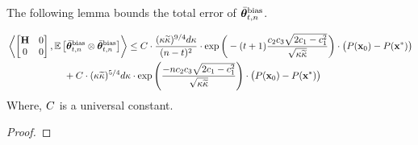 The following lemma bounds the total error of ${\bar{\boldsymbol{\theta}}}_{t,n}^{\textrm{bias}}$.
\begin{lemma}\label{lem:bound-bias}
\iffalse
	\begin{align*}
	&\iprod{\begin{bmatrix}
			\Cov & \zero \\ \zero & \zero
		\end{bmatrix}}{\E{\thetavb^{\textrm{bias}} \otimes \thetavb^{\text{bias}}}} \\ &\leq \frac{1792}{(n-t)^2(\cone\cfour)^{5/4}}\cdot\frac{(\cnH\cnS)^{9/4}d}{\delta\cfour}\cdot\exp\bigg(-(t+1)\frac{\ctwo\cthree\sqrt{2\cone-\cone^2}}{\sqrt{\cnH\cnS}}\bigg)\norm{\thetat[0]}^2 +\\&\qquad\qquad \frac{5376}{(\cone\cfour)^{1/4}}\frac{(\cnH\cnS)^{5/4}d}{\delta\cfour}\exp\left(\frac{-n \ctwo \cthree \sqrt{2\cone-\cone^2} }{\sqrt{\cnH\cnS}}\right) \cdot \norm{\thetat[0]}^2.
	\end{align*}
	\fi
	\iffalse
	\begin{align*}
		&\iprod{\begin{bmatrix}
			\Cov & \zero \\ \zero & \zero
			\end{bmatrix} }{\E{\thetavb^{\textrm{bias}} \otimes \thetavb^{\text{bias}}}} \leq			\UC\cdot\frac{(\cnH\cnS)^{9/4}d}{\delta}\cdot\exp\bigg(-(t+1)\frac{\ctwo\cthree\sqrt{2\cone-\cone^2}}{\sqrt{\cnH\cnS}}\bigg)\norm{\thetat[0]}^2 \nonumber\\&\qquad\qquad\qquad+  \UC\cdot\frac{(\cnH\cnS)^{5/4}d}{\delta}(n-t)\exp\left(\frac{-n \ctwo \cthree \sqrt{2\cone-\cone^2} }{\sqrt{\cnH\cnS}}\right) \cdot \norm{\thetat[0]}^2
			\end{align*}	
			\fi
	\begin{align*}
		&\left\langle \begin{bmatrix}
			\mathbf{H} & 0 \\ 0 & 0
			\end{bmatrix} , \mathbb{E}\left[{\bar{\boldsymbol{\theta}}}_{t,n}^{\textrm{bias}} \otimes {\bar{\boldsymbol{\theta}}}_{t,n}^{\text{bias}}\right] \right\rangle \leq		C\cdot\frac{({\kappa}\widetilde{\kappa})^{9/4}d{\kappa}}{(n-t)^2}\cdot\exp\bigg(-(t+1)\frac{c_2c_3\sqrt{2c_1-c_1^2}}{\sqrt{{\kappa}\widetilde{\kappa}}}\bigg)\cdot \big(P(\mathbf{x}_0)-P(\mathbf{x}^*)\big) \nonumber\\&\qquad\qquad\qquad+  C\cdot({\kappa}\widetilde{\kappa})^{5/4}d{\kappa}\cdot\exp\left(\frac{-n c_2 c_3 \sqrt{2c_1-c_1^2} }{\sqrt{{\kappa}\widetilde{\kappa}}}\right) \cdot \big(P(\mathbf{x}_0)-P(\mathbf{x}^*)\big)
			\end{align*}	
			Where, $C$ is a universal constant.
\end{lemma}
\begin{proof}

\end{proof}

